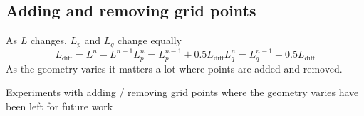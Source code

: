 \subsection{Adding and removing grid points}
As $L$ changes, $L_p$ and $L_q$ change equally
\begin{equation}
    L_\text{diff} = L^n-L^{n-1}
    L_p^n = L_p^{n-1} + 0.5 L_\text{diff} L_q^n =  L_q^{n-1} + 0.5L_\text{diff}    
\end{equation}
As the geometry varies it matters a lot where points are added and removed. 

Experiments with adding / removing grid points where the geometry varies have been left for future work